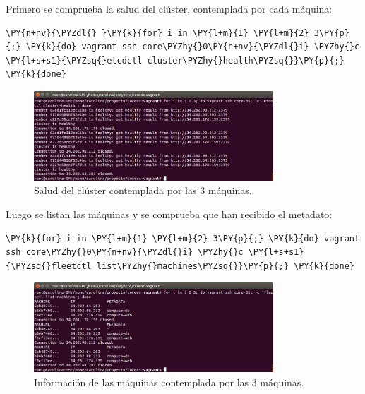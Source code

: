 Primero se comprueba la salud del clúster, contemplada por cada máquina:

\begin{framed_shaded}
\begin{Verbatim}[fontsize=\relsize{-2.5},fontseries=b,commandchars=\\\{\}]
\PY{n+nv}{\PYZdl{} }\PY{k}{for} i in \PY{l+m}{1} \PY{l+m}{2} 3\PY{p}{;} \PY{k}{do} vagrant ssh core\PYZhy{}0\PY{n+nv}{\PYZdl{}i} \PYZhy{}c \PY{l+s+s1}{\PYZsq{}etcdctl cluster\PYZhy{}health\PYZsq{}}\PY{p}{;} \PY{k}{done}
\end{Verbatim}
\end{framed_shaded}

\begin{figure}[H]
\centering
\includegraphics[width=0.8\textwidth]{images/figures/skydns-health.png}
\caption{Salud del clúster contemplada por las 3 máquinas.}
\end{figure}

Luego se listan las máquinas y se comprueba que han recibido el metadato:

\begin{framed_shaded}
\begin{Verbatim}[fontsize=\relsize{-2.5},fontseries=b,commandchars=\\\{\}]
\PY{k}{for} i in \PY{l+m}{1} \PY{l+m}{2} 3\PY{p}{;} \PY{k}{do} vagrant ssh core\PYZhy{}0\PY{n+nv}{\PYZdl{}i} \PYZhy{}c \PY{l+s+s1}{\PYZsq{}fleetctl list\PYZhy{}machines\PYZsq{}}\PY{p}{;} \PY{k}{done}
\end{Verbatim}
\end{framed_shaded}

\begin{figure}[H]
\centering
\includegraphics[width=0.8\textwidth]{images/figures/skydns-machines.png}
\caption{Información de las máquinas contemplada por las 3 máquinas.}
\end{figure}

